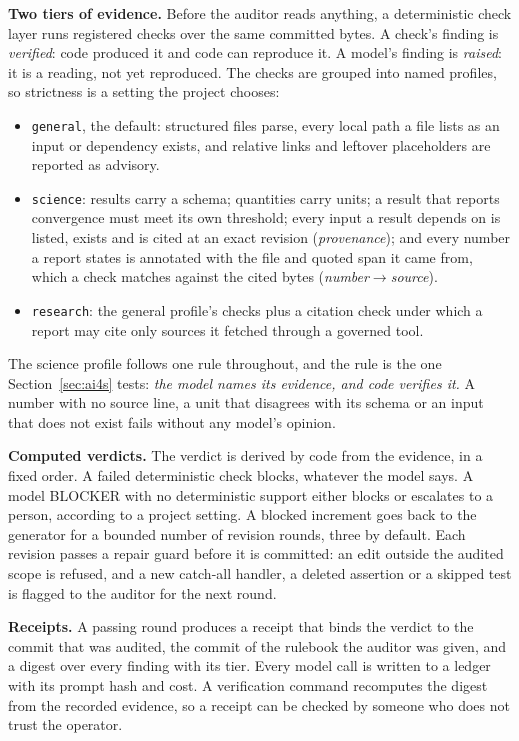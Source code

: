 \textbf{Two tiers of evidence.} Before the auditor reads anything, a deterministic check layer
runs registered checks over the same committed bytes. A check's finding is \emph{verified}: code
produced it and code can reproduce it. A model's finding is \emph{raised}: it is a reading, not
yet reproduced. The checks are grouped into named profiles, so strictness is a setting the
project chooses:
\begin{itemize}\itemsep0pt
\item \texttt{general}, the default: structured files parse, every local path a file lists as an
  input or dependency exists, and relative links and leftover placeholders are reported as
  advisory.
\item \texttt{science}: results carry a schema; quantities carry units; a result that reports
  convergence must meet its own threshold; every input a result depends on is listed, exists and is cited at an exact revision
  (\emph{provenance}); and every number a report states is annotated with the file and quoted span
  it came from, which a check matches against the cited bytes (\emph{number$\to$source}).
\item \texttt{research}: the general profile's checks plus a citation check under which a report may cite only
  sources it fetched through a governed tool.
\end{itemize}
The science profile follows one rule throughout, and the rule is the one Section~\ref{sec:ai4s} tests: \emph{the
model names its evidence, and code verifies it.} A number with no source line, a unit that
disagrees with its schema or an input that does not exist fails without any model's opinion.

\textbf{Computed verdicts.} The verdict is derived by code from the evidence, in a
fixed order. A failed deterministic check blocks, whatever the model says. A model BLOCKER with
no deterministic support either blocks or escalates to a person, according to a project setting.
A blocked increment goes back to the generator for a bounded number of revision rounds, three by
default. Each revision passes a repair guard before it is committed: an edit outside the audited
scope is refused, and a new catch-all handler, a deleted assertion or a skipped test is flagged to
the auditor for the next round.

\textbf{Receipts.} A passing round produces a receipt that binds the verdict to the commit that was
audited, the commit of the rulebook the auditor was given, and a digest over every finding with its
tier. Every model call is written to a ledger with its prompt hash and cost. A verification command
recomputes the digest from the recorded evidence, so a receipt can be checked by someone who does
not trust the operator.

